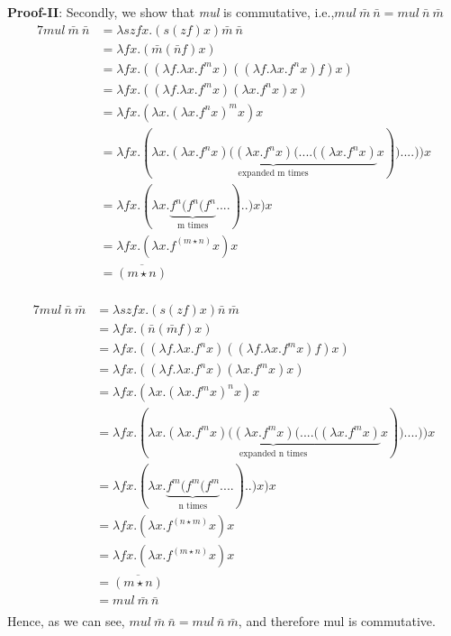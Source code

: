 \documentclass[11pt]{article}
\begin{document}
\begin{enumerate}
\begin{enumerate}
\textbf{Proof-II}: Secondly, we show that \textit{mul}  is commutative, i.e.,$mul\: \bar{m} \: \bar{n}=mul\:\bar{n} \: \bar{m}$ \\
    \begin{alignat*}{7}
    mul\:\bar{m}\:\bar{n}  &= \lambda szfx.( s(zf) x)\bar{m}\:\bar{n}\\
    &= \lambda fx.( \bar{m} (\bar{n}f) x) \\
    &= \lambda fx.( (\lambda f.\lambda x. f^m x) ((\lambda f.\lambda x. f^n x) f) x) \\
    &= \lambda fx.( (\lambda f.\lambda x. f^m x) (\lambda x. f^n x ) x) \\
    &= \lambda fx. (\lambda x. (\lambda x. f^n x )^m x)  x\\
    &= \lambda fx. (\lambda x.   \underbrace{(\lambda x. f^n x )( (\lambda x. f^n x ) (.... ((\lambda x. f^n x )}_\text{expanded m times}x))....)    )  x\\
    &= \lambda fx. (\lambda x. \underbrace{f^n(f^n(f^n}_\text{m times}....)..) x)  x\\
    &= \lambda fx. (\lambda x. f^{(m\star n)} x)  x\\
    &= \overline{(m\star n)}\\
    \end{alignat*}
    
    \begin{alignat*}{7}
    mul\:\bar{n}\:\bar{m}  &= \lambda szfx.( s(zf) x)\bar{n}\:\bar{m}\\
    &= \lambda fx.( \bar{n} (\bar{m}f) x) \\
    &= \lambda fx.( (\lambda f.\lambda x. f^n x) ((\lambda f.\lambda x. f^m x) f) x) \\
    &= \lambda fx.( (\lambda f.\lambda x. f^n x) (\lambda x. f^m x ) x) \\
    &= \lambda fx. (\lambda x. (\lambda x. f^m x )^n x)  x\\
    &= \lambda fx. (\lambda x.   \underbrace{(\lambda x. f^m x )( (\lambda x. f^m x ) (.... ((\lambda x. f^m x )}_\text{expanded n times}x))....)    )  x\\
    &= \lambda fx. (\lambda x. \underbrace{f^m(f^m(f^m}_\text{n times}....)..) x)  x\\
    &= \lambda fx. (\lambda x. f^{(n\star m)} x)  x\\
    &= \lambda fx. (\lambda x. f^{(m\star n)} x)  x\\
    &= \overline{(m\star n)}\\
    &= mul\: \bar{m} \: \bar{n}\\
    \end{alignat*}
Hence, as we can see, $mul\: \bar{m} \: \bar{n}=mul\:\bar{n} \: \bar{m}$, and therefore mul is commutative.

\end{enumerate}
\end{enumerate}
\end{document}
